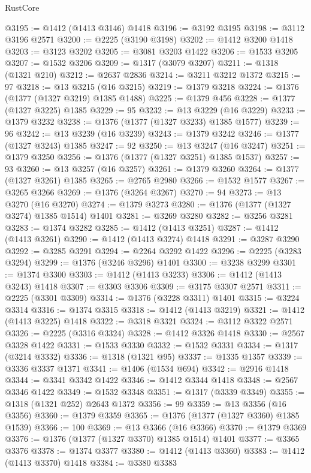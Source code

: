 \begin{lexlean}{RustCore}
\begin{coremodule}
@3195 := @1412 (@1413 @3146) @1418
@3196 := @3192 @3195
@3198 := @3112 @3196 @2571
@3200 := @2225 (@3190 @3198)
@3202 := @1412 @3200 @1418
@3203 := @3123 @3202
@3205 := @3081 @3203 @1422
@3206 := @1533 @3205
@3207 := @1532 @3206
@3209 := @1317 (@3079 @3207)
@3211 := @1318 (@1321 @210)
@3212 := @2637 @2836
@3214 := @3211 @3212 @1372
@3215 := 97
@3218 := @13 @3215 (@16 @3215)
@3219 := @1379 @3218
@3224 := @1376 (@1377 (@1327 @3219) @1385 @1488)
@3225 := @1379 @456
@3228 := @1377 (@1327 @3225) @1385
@3229 := 95
@3232 := @13 @3229 (@16 @3229)
@3233 := @1379 @3232
@3238 := @1376 (@1377 (@1327 @3233) @1385 @1577)
@3239 := 96
@3242 := @13 @3239 (@16 @3239)
@3243 := @1379 @3242
@3246 := @1377 (@1327 @3243) @1385
@3247 := 92
@3250 := @13 @3247 (@16 @3247)
@3251 := @1379 @3250
@3256 := @1376 (@1377 (@1327 @3251) @1385 @1537)
@3257 := 93
@3260 := @13 @3257 (@16 @3257)
@3261 := @1379 @3260
@3264 := @1377 (@1327 @3261) @1385
@3265 := @2765 @2980
@3266 := @1532 @1577
@3267 := @3265 @3266
@3269 := @1376 (@3264 @3267)
@3270 := 94
@3273 := @13 @3270 (@16 @3270)
@3274 := @1379 @3273
@3280 := @1376 (@1377 (@1327 @3274) @1385 @1514) @1401
@3281 := @3269 @3280
@3282 := @3256 @3281
@3283 := @1374 @3282
@3285 := @1412 (@1413 @3251)
@3287 := @1412 (@1413 @3261)
@3290 := @1412 (@1413 @3274) @1418
@3291 := @3287 @3290
@3292 := @3285 @3291
@3294 := @2264 @3292 @1422
@3296 := @2225 (@3283 @3294)
@3299 := @1376 (@3246 @3296) @1401
@3300 := @3238 @3299
@3301 := @1374 @3300
@3303 := @1412 (@1413 @3233)
@3306 := @1412 (@1413 @3243) @1418
@3307 := @3303 @3306
@3309 := @3175 @3307 @2571
@3311 := @2225 (@3301 @3309)
@3314 := @1376 (@3228 @3311) @1401
@3315 := @3224 @3314
@3316 := @1374 @3315
@3318 := @1412 (@1413 @3219)
@3321 := @1412 (@1413 @3225) @1418
@3322 := @3318 @3321
@3324 := @3112 @3322 @2571
@3326 := @2225 (@3316 @3324)
@3328 := @1412 @3326 @1418
@3330 := @2567 @3328 @1422
@3331 := @1533 @3330
@3332 := @1532 @3331
@3334 := @1317 (@3214 @3332)
@3336 := @1318 (@1321 @95)
@3337 := @1335 @1357
@3339 := @3336 @3337 @1371
@3341 := @1406 (@1534 @694)
@3342 := @2916 @1418
@3344 := @3341 @3342 @1422
@3346 := @1412 @3344 @1418
@3348 := @2567 @3346 @1422
@3349 := @1532 @3348
@3351 := @1317 (@3339 @3349)
@3355 := @1318 (@1321 @252) @2643 @1372
@3356 := 99
@3359 := @13 @3356 (@16 @3356)
@3360 := @1379 @3359
@3365 := @1376 (@1377 (@1327 @3360) @1385 @1539)
@3366 := 100
@3369 := @13 @3366 (@16 @3366)
@3370 := @1379 @3369
@3376 := @1376 (@1377 (@1327 @3370) @1385 @1514) @1401
@3377 := @3365 @3376
@3378 := @1374 @3377
@3380 := @1412 (@1413 @3360)
@3383 := @1412 (@1413 @3370) @1418
@3384 := @3380 @3383

\end{coremodule}
\end{lexlean}
